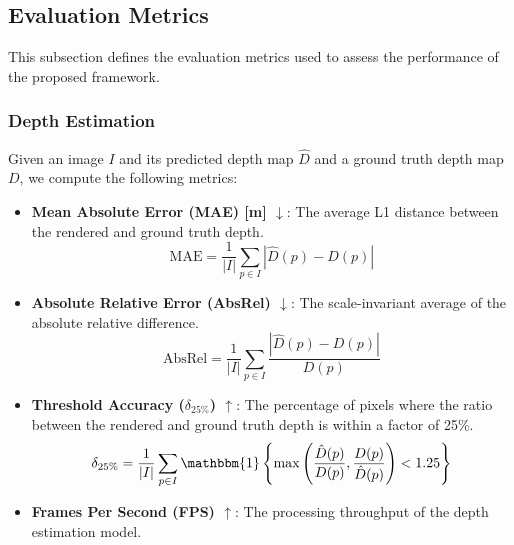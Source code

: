 
\subsection{Evaluation Metrics}
This subsection defines the evaluation metrics used to assess the performance of the proposed framework.

\subsubsection{Depth Estimation}
Given an image $I$ and its predicted depth map $\hat{D}$ and a ground truth depth map $D$, we compute the following metrics:
\begin{itemize}
	\item \textbf{Mean Absolute Error (MAE) [m] $\downarrow$}: The average L1 distance between the rendered and ground truth depth.
	      \begin{equation}
		      \text{MAE} = \frac{1}{|I|} \sum_{p \in I} |\hat{D}(p) - D(p)|
	      \end{equation}

	\item \textbf{Absolute Relative Error (AbsRel) $\downarrow$}: The scale-invariant average of the absolute relative difference.
	      \begin{equation}
		      \text{AbsRel} = \frac{1}{|I|} \sum_{p \in I} \frac{|\hat{D}(p) - D(p)|}{D(p)}
	      \end{equation}

	\item \textbf{Threshold Accuracy ($\delta_{25\%}$) $\uparrow$}: The percentage of pixels where the ratio between the rendered and ground truth depth is within a factor of 25\%.
	      \begin{equation}
		      \delta_{25\%} = \frac{1}{|I|} \sum_{p \in I} \mathbbm{1}\left\{\max\left(\frac{\hat{D}(p)}{D(p)}, \frac{D(p)}{\hat{D}(p)}\right) < 1.25\right\}
	      \end{equation}

	\item \textbf{Frames Per Second (FPS) $\uparrow$}: The processing throughput of the depth estimation model.
\end{itemize}

